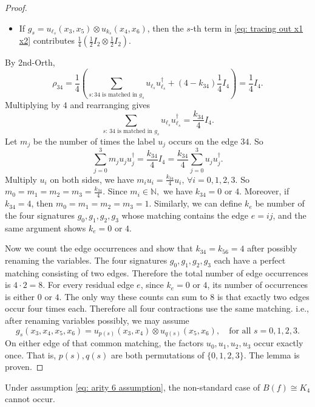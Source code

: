 \begin{proof}
\begin{itemize}
        \item If $g_s=u_{\ell_s}(x_3,x_5)\otimes u_{k_s}(x_4,x_6)$, then the $s$-th term in \eqref{eq: tracing out x1 x2} contributes $\frac{1}{4}(\frac{1}{2}I_2\otimes \frac{1}{2}I_2)$.
    \end{itemize}
    By {\sc 2nd-Orth}, $$\rho_{34}=\frac{1}{4}\left(\sum_{s: 34 \text{ is matched in } g_s}u_{\ell_s}u_{\ell_s}^\dagger+(4-k_{34})\frac{1}{4}I_4 \right)=\frac{1}{4}I_4.$$
    Multiplying by \(4\) and rearranging gives
    \begin{equation*}
        \sum_{s:\,34\text{ is matched in }g_s}u_{\ell_s}u_{\ell_s}^\dagger = \frac{k_{34}}4I_4.
    \end{equation*}
    Let \(m_j\) be the number of times the label \(u_j\) occurs on the edge \(34\).
    So
    $$\sum_{j=0}^3 m_j u_{j}u_j^\dagger=\frac{k_{34}}{4}I_4=\frac{k_{34}}{4} \sum_{j=0}^3 u_ju_j^\dagger.$$
    Multiply $u_i$ on both sides, we have $m_iu_i=\frac{k_{34}}{4}u_i,\,\forall i=0,1,2,3.$
    So $m_0=m_1=m_2=m_3=\frac{k_{34}}{4}.$
    Since $m_i\in \mathbb{N},$ we have $k_{34}=0$ or $4.$
    Moreover, if $k_{34}=4$, then $m_0=m_1=m_2=m_3=1.$
    Similarly, we can define $k_e$ be number of the four signatures $g_0,g_1,g_2,g_3$ whose matching contains the edge $e=ij$, and the same argument shows $k_e=0$ or $4.$

    Now we count the edge occurrences and show that $k_{34}=k_{56}=4$ after possibly renaming the variables.
    The four signatures \(g_0,g_1,g_2,g_3\) each have a perfect matching consisting of two edges. 
    Therefore the total number of edge occurrences is
    $4\cdot2=8.$
    For every residual edge \(e\), since $k_e=0$ or $4$, its number of occurrences is either \(0\) or \(4\). The only way these counts can sum to \(8\) is that exactly two edges occur four times each.
    Therefore all four contractions use the same matching.
    i.e., after renaming variables possibly, we may assume $$g_s(x_3,x_4,x_5,x_6)=u_{p(s)}(x_3,x_4)\otimes u_{q(s)}(x_5,x_6),\quad \text{for all } s=0,1,2,3.$$
    On either edge of that common matching, the factors \(u_0,u_1,u_2,u_3\) occur exactly once.
    That is, $p(s),q(s)$ are both permutations of $\{0,1,2,3\}.$
    The lemma is proven.
\end{proof}

\begin{lemma}\label{lm: K4 non-standard}
Under assumption \eqref{eq: arity 6 assumption}, the non-standard case of
$B(f)\cong K_4$ cannot occur.
\end{lemma}

